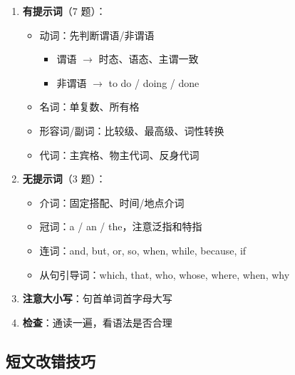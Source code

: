 \begin{enumerate}
  \item \textbf{有提示词}（7 题）：
    \begin{itemize}
      \item 动词：先判断谓语/非谓语
      \begin{itemize}
        \item 谓语 $\rightarrow$ 时态、语态、主谓一致
        \item 非谓语 $\rightarrow$ to do / doing / done
      \end{itemize}
      \item 名词：单复数、所有格
      \item 形容词/副词：比较级、最高级、词性转换
      \item 代词：主宾格、物主代词、反身代词
    \end{itemize}
  \item \textbf{无提示词}（3 题）：
    \begin{itemize}
      \item 介词：固定搭配、时间/地点介词
      \item 冠词：a / an / the，注意泛指和特指
      \item 连词：and, but, or, so, when, while, because, if
      \item 从句引导词：which, that, who, whose, where, when, why
    \end{itemize}
  \item \textbf{注意大小写}：句首单词首字母大写
  \item \textbf{检查}：通读一遍，看语法是否合理
\end{enumerate}

\subsection{短文改错技巧}


